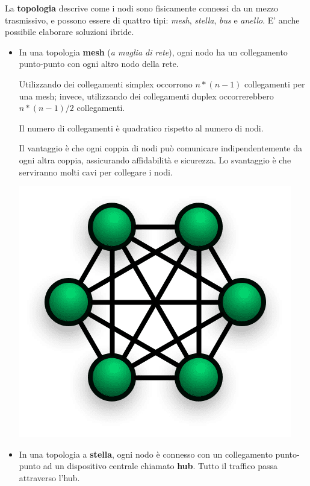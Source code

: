         La \textbf{topologia} descrive come i nodi sono fisicamente connessi da un mezzo trasmissivo, e possono essere di quattro tipi: \textit{mesh}, \textit{stella}, \textit{bus} e \textit{anello}. E' anche possibile elaborare soluzioni ibride.
        
        \begin{itemize}
            \item 
            In una topologia \textbf{mesh} (\textit{a maglia di rete}), ogni nodo ha un collegamento punto-punto con ogni altro nodo della rete. 
            
            Utilizzando dei collegamenti simplex occorrono \(n*(n-1)\) collegamenti per una mesh; invece, utilizzando dei collegamenti duplex occorrerebbero \(n*(n-1)/2\) collegamenti.
            
            Il numero di collegamenti è quadratico rispetto al numero di nodi.
            
            Il vantaggio è che ogni coppia di nodi può comunicare indipendentemente da ogni altra coppia, assicurando affidabilità e sicurezza. Lo svantaggio è che serviranno molti cavi per collegare i nodi.
            
            \begin{center}
                \includegraphics[scale=0.25]{images/MeshNetwork.png}
            \end{center}
            
            \item
            In una topologia a \textbf{stella}, ogni nodo è connesso con un collegamento punto-punto ad un dispositivo centrale chiamato \textbf{hub}. Tutto il traffico passa attraverso l'hub.
            

\end{itemize}
